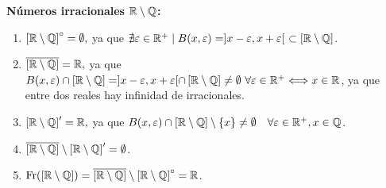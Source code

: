 \begin{ejercicio}
    \textbf{Números irracionales $\mathbb{R}\setminus \mathbb{Q}$:}
    \begin{enumerate}
        \item $\left[\mathbb{R}\setminus \mathbb{Q}\right]^\circ = \emptyset,$ ya que $\nexists \varepsilon\in \mathbb{R}^+\mid B(x,\varepsilon)=]x-\varepsilon, x+\varepsilon[~\subset \left[\mathbb{R}\setminus \mathbb{Q}\right]$.
        
        \item $\overline{\left[\mathbb{R}\setminus \mathbb{Q}\right]} = \mathbb{R},$ ya
        que $B(x,\varepsilon)\cap \left[\mathbb{R}\setminus \mathbb{Q}\right] = ]x-\varepsilon, x+\varepsilon[\cap \left[\mathbb{R}\setminus \mathbb{Q}\right]\neq \emptyset ~\forall \varepsilon\in \mathbb{R}^+ \Longleftrightarrow x\in \mathbb{R}$, ya que entre dos reales hay infinidad de irracionales.
        
        \item $\left[\mathbb{R}\setminus \mathbb{Q}\right]' = \mathbb{R},$ ya que $B(x,\varepsilon)\cap \left[\mathbb{R}\setminus \mathbb{Q}\right]\setminus\{x\} \neq \emptyset \quad \forall \varepsilon\in \mathbb{R}^+, x\in \mathbb{Q}$.
        
        \item $\overline{\left[\mathbb{R}\setminus \mathbb{Q}\right]}\setminus \left[\mathbb{R}\setminus \mathbb{Q}\right]' =\emptyset$.
        
        \item $\operatorname{Fr}(\left[\mathbb{R}\setminus \mathbb{Q}\right])=\overline{\left[\mathbb{R}\setminus \mathbb{Q}\right]}\setminus 
        \left[\mathbb{R}\setminus \mathbb{Q}\right]^\circ=\mathbb{R}$.
    \end{enumerate}
\end{ejercicio}




